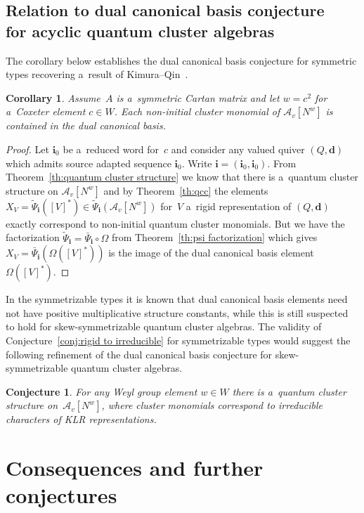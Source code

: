 \documentclass[pdftex]{sigma}
\numberwithin{equation}{section}
\newtheorem{Conjecture}[Theorem]{Conjecture}
\newtheorem{Corollary}[Theorem]{Corollary}
\begin{document}
\subsection{Relation to dual canonical basis conjecture\\ for acyclic quantum cluster algebras}
The corollary below establishes the dual canonical basis conjecture for symmetric types re\-co\-ve\-ring a~result of
Kimura--Qin~\cite{kimura-qin}.
\begin{Corollary}
Assume~$A$ is a~symmetric Cartan matrix and let $w=c^2$ for a~Coxeter element $c\in W$.
Each non-initial cluster monomial of $\mathcal{A}_v[N^w]$ is contained in the dual canonical basis.
\end{Corollary}
\begin{proof}
Let $\mathbf{i}_0$ be a~reduced word for~$c$ and consider any valued quiver $(Q,\mathbf{d})$ which admits source adapted
sequence $\mathbf{i}_0$.
Write $\mathbf{i}=(\mathbf{i}_0,\mathbf{i}_0)$.
From Theorem~\ref{th:quantum cluster structure} we know that there is a~quantum cluster structure on
$\mathcal{A}_v[N^w]$ and by Theorem~\ref{th:qcc} the elements
$X_V=\widetilde\Psi_\mathbf{i}([V]^*)\in\widetilde\Psi_\mathbf{i}(\mathcal{A}_v[N^w])$ for~$V$ a~rigid representation of
$(Q,\mathbf{d})$ exactly correspond to non-initial quantum cluster monomials.
But we have the factorization $\widetilde\Psi_\mathbf{i}=\bar\Psi_\mathbf{i}\circ\Omega$ from Theorem~\ref{th:psi
factorization} which gives $X_V=\bar\Psi_\mathbf{i}(\Omega([V]^*))$ is the image of the dual canonical basis element $\Omega([V]^*)$.
\end{proof}

In the symmetrizable types it is known that dual canonical basis elements need not have positive multiplicative
structure constants, while this is still suspected to hold for skew-symmetri\-zable quantum cluster algebras.
The validity of Conjecture~\ref{conj:rigid to irreducible} for symmetrizable types would suggest the following
ref\/inement of the dual canonical basis conjecture for skew-symmetrizable quantum cluster algebras.
\begin{Conjecture}
For any Weyl group element $w\in W$ there is a~quantum cluster structure on~$\mathcal{A}_v[N^w]$, where cluster monomials
correspond to irreducible characters of KLR representations.
\end{Conjecture}

\section{Consequences and further conjectures}\label{sec:generalizations}
\end{document}
